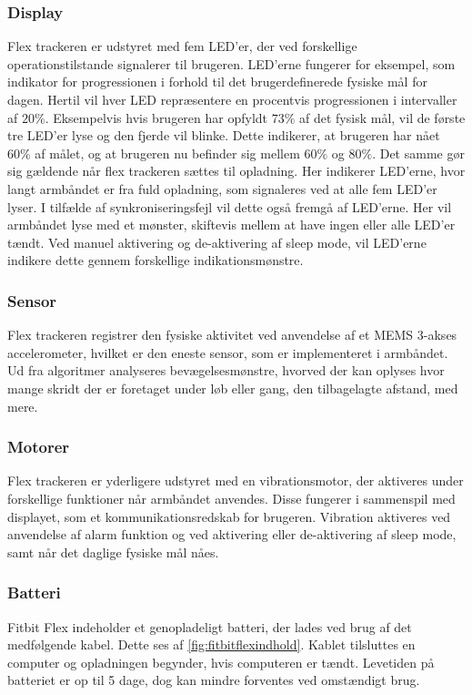 \subsubsection{Display} 
Flex trackeren er udstyret med fem LED'er, der ved forskellige operationstilstande signalerer til brugeren. 
LED'erne fungerer for eksempel, som indikator for progressionen i forhold til det brugerdefinerede fysiske mål for dagen. Hertil vil hver LED repræsentere en procentvis progressionen i intervaller af $20 \%$. Eksempelvis hvis brugeren har opfyldt $73 \%$ af det fysisk mål, vil de første tre LED'er lyse og den fjerde vil blinke. Dette indikerer, at brugeren har nået $60 \%$ af målet, og at brugeren nu befinder sig mellem $60 \%$ og $80 \%$. 
Det samme gør sig gældende når flex trackeren sættes til opladning. Her indikerer LED'erne, hvor langt armbåndet er fra fuld opladning, som signaleres ved at alle fem LED'er lyser. 
I tilfælde af synkroniseringsfejl vil dette også fremgå af LED'erne. Her vil armbåndet lyse med et mønster, skiftevis mellem at have ingen eller alle LED'er tændt. 
Ved manuel aktivering og de-aktivering af sleep mode, vil LED'erne indikere dette gennem forskellige indikationsmønstre.

\subsubsection{Sensor} 
Flex trackeren registrer den fysiske aktivitet ved anvendelse af et MEMS 3-akses accelerometer, hvilket er den eneste sensor, som er implementeret i armbåndet. Ud fra algoritmer analyseres bevægelsesmønstre, hvorved der kan oplyses hvor mange skridt der er foretaget under løb eller gang, den tilbagelagte afstand, med mere. 

\subsubsection{Motorer}
Flex trackeren er yderligere udstyret med en vibrationsmotor, der aktiveres under forskellige funktioner når armbåndet anvendes. Disse fungerer i sammenspil med displayet, som et kommunikationsredskab for brugeren. Vibration aktiveres ved anvendelse af alarm funktion og ved aktivering eller de-aktivering af sleep mode, samt når det daglige fysiske mål nåes. 
 
\subsubsection{Batteri} 
Fitbit Flex indeholder et genopladeligt batteri, der lades ved brug af det medfølgende kabel. Dette ses af \autoref{fig:fitbitflexindhold}. Kablet tilsluttes en computer og opladningen begynder, hvis computeren er tændt. 
Levetiden på batteriet er op til 5 dage, dog kan mindre forventes ved omstændigt brug.


